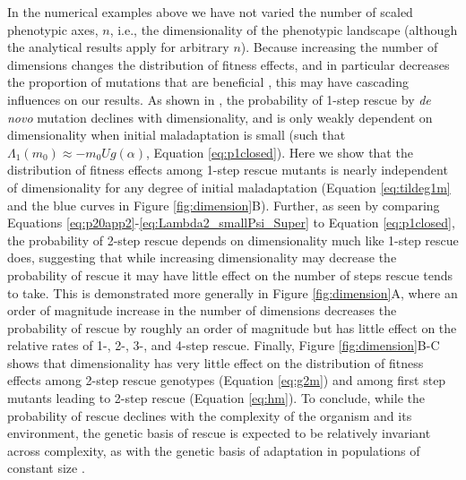 \documentclass[9pt,twocolumn,twoside,lineno]{gsajnl}
\begin{document}
In the numerical examples above we have not varied the number of scaled phenotypic axes, $n$, i.e., the dimensionality of the phenotypic landscape (although the analytical results apply for arbitrary $n$).
Because increasing the number of dimensions changes the distribution of fitness effects, and in particular decreases the proportion of mutations that are beneficial \citep{Fisher1930}, this may have cascading influences on our results.
As shown in \cite{Anciaux2018}, the probability of 1-step rescue by \textit{de novo} mutation declines with dimensionality, and is only weakly dependent on dimensionality when initial maladaptation is small (such that $\Lambda_1(m_0) \approx -m_0 U g(\alpha)$, Equation \ref{eq:p1closed}). 
Here we show that the distribution of fitness effects among 1-step rescue mutants is nearly independent of dimensionality for any degree of initial maladaptation (Equation \ref{eq:tildeg1m} and the blue curves in Figure \ref{fig:dimension}B).
Further, as seen by comparing Equations \ref{eq:p20app2}-\ref{eq:Lambda2_smallPsi_Super} to Equation \ref{eq:p1closed}, the probability of 2-step rescue depends on dimensionality much like 1-step rescue does, suggesting that while increasing dimensionality may decrease the probability of rescue it may have little effect on the number of steps rescue tends to take.
This is demonstrated more generally in Figure \ref{fig:dimension}A, where an order of magnitude increase in the number of dimensions decreases the probability of rescue by roughly an order of magnitude but has little effect on the relative rates of 1-, 2-, 3-, and 4-step rescue.
Finally, Figure \ref{fig:dimension}B-C shows that dimensionality has very little effect on the distribution of fitness effects among 2-step rescue genotypes (Equation \ref{eq:g2m}) and among first step mutants leading to 2-step rescue (Equation \ref{eq:hm}).
To conclude, while the probability of rescue declines with the complexity of the organism and its environment, the genetic basis of rescue is expected to be relatively invariant across complexity, as with the genetic basis of adaptation in populations of constant size \citep[][see also gray curves in Figure \ref{fig:dimension}B,C]{Orr1998}.
\end{document}
